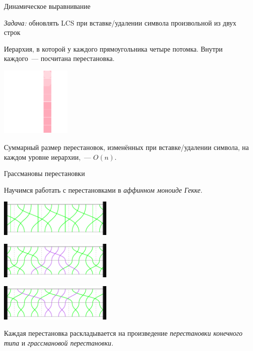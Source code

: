 \documentclass[svgnames]{beamer}
\begin{document}
\begin{frame}{Динамическое выравнивание}
\vspace{-7mm}

\begin{block}{\vspace*{-3ex}}
{\it Задача:} обновлять LCS при вставке/удалении символа произвольной из двух строк
\end{block}

Иерархия, в которой у каждого прямоугольника четыре потомка.
Внутри каждого~— посчитана перестановка.

\begin{center}
  \includegraphics[width=3.4cm]{svg/dynamic}
\end{center}

Суммарный размер перестановок, изменённых при вставке/удалении символа, на каждом уровне иерархии,~— \(O(n)\).

\end{frame}


\begin{frame}{Грассмановы перестановки}
\vspace{-3mm}

Научимся работать с перестановками в {\it аффинном моноиде Гекке.}

\begin{center}
  \includegraphics[width=5.5cm]{img-fg/tP}
  
  \includegraphics[width=5.5cm]{img-fg/tP-FG}

  \includegraphics[width=5.5cm]{img-fg/tP-GF}
\end{center}

Каждая перестановка раскладывается на произведение {\it перестановки конечного типа} и {\it грассмановой перестановки.} \vspace{2mm}

\end{frame}
\end{document}
